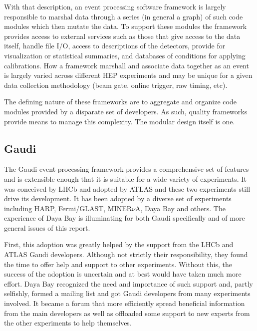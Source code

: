 With that description, an event processing software framework is
largely responsible to marshal data through a series (in general a
graph) of such code modules which then mutate the data.  To support
these modules the framework provides access to external services such
as those that give access to the data itself, handle file I/O, access
to descriptions of the detectors, provide for visualization or
statistical summaries, and databases of conditions for applying
calibrations. How a framework marshall and associate data together as an event is largely varied across different HEP experiments and may be unique for a given data collection methodology (beam gate, online trigger, raw timing, etc). 


The defining nature of these frameworks are to aggregate and organize
code modules provided by a disparate set of developers.  As such,
quality frameworks provide means to manage this complexity.  The
modular design itself is one.

\subsection{Gaudi}

The Gaudi event processing framework provides a comprehensive set of
features and is extensible enough that it is suitable for a wide
variety of experiments.  It was conceived by LHCb and adopted by ATLAS
and these two experiments still drive its development.  It has been
adopted by a diverse set of experiments including HARP, Fermi/GLAST,
MINER$\nu$A, Daya Bay and others.  The experience of Daya Bay is
illuminating for both Gaudi specifically and of more general issues of
this report.

First, this adoption was greatly helped by the support from the LHCb
and ATLAS Gaudi developers.  Although not strictly their
responsibility, they found the time to offer help and support to other
experiments.  Without this, the success of the adoption is uncertain
and at best would have taken much more effort.  Daya Bay recognized
the need and importance of such support and, partly selfishly, formed
a mailing list\cite{gauditalk} and got Gaudi developers from many
experiments involved.  It became a forum that more efficiently spread
beneficial information from the main developers as well as offloaded
some support to new experts from the other experiments to help
themselves.

